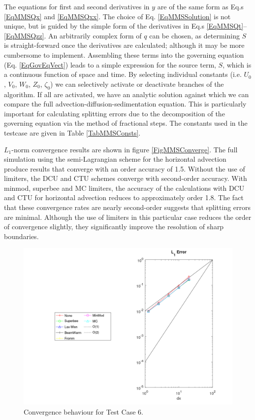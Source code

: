 The equations for first and second derivatives in $y$ are of the same form as
Eq.s \ref{EqMMSQx} and \ref{EqMMSQxx}.
The choice of Eq. \ref{EqMMSSolution} is not unique, but is guided by the simple form of
the derivatives in Eq.s \ref{EqMMSQt}--\ref{EqMMSQzz}.  An arbitrarily complex form of
$q$ can be chosen, as determining $S$ is straight-forward once the derivatives are
calculated; although it may be more cumbersome to implement. Assembling these terms into
the governing equation (Eq. \ref{EqGovEqVect}) leads to a simple expression for the source
term, $S$, which is a continuous function of space and time.  By selecting individual
constants (i.e. $U_0$, $V_0$, $W_0$, $Z_0$, $\zeta_0$) we can selectively activate or
deactivate branches of the algorithm.  If all are activated, we have an analytic solution
against which we can compare the full advection-diffusion-sedimentation equation.  This is
particularly important for calculating splitting errors due to the decomposition of the
governing equation via the method of fractional steps. The constants used in the testcase
are given in Table \ref{TabMMSConsts}.

$L_1$-norm convergence results are shown in figure \ref{FigMMSConverge}.  The full
simulation using the semi-Lagrangian scheme for the horizontal advection produce results
that converge with an order accuracy of 1.5.
Without the use of limiters, the DCU and CTU schemes converge with second-order accuracy.
With minmod, superbee and MC limiters, the accuracy of the calculations with DCU and CTU
for horizontal advection reduces to approximately order 1.8.  The fact that these
convergence rates are nearly second-order suggests that splitting errors are minimal.
Although the use of limiters in this particular case reduces the order of convergence
slightly, they significantly improve the resolution of sharp boundaries.

\begin{figure}[htbp]\vspace*{0cm}\hspace*{0cm}
\includegraphics[angle=0,scale=0.4]{Figures/Apx_Test/TC5_XY_Solution_Error_L1.png}
\parbox{15cm}{\caption{\label{FigTest_ConvTC6def}
Convergence behaviour for Test Case 6.
}}
\end{figure}


